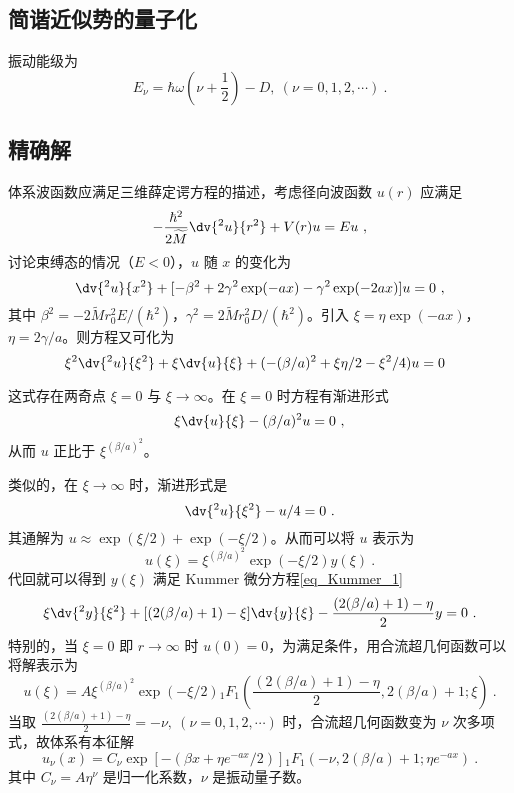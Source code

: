 \subsection{简谐近似势的量子化}
振动能级为
$$E_\nu = \hbar \omega (\nu + \frac12) - D , \ (\nu = 0, 1, 2, \cdots) ~.$$

\subsection{精确解}
体系波函数应满足三维薛定谔方程的描述，考虑径向波函数 $u(r)$ 应满足
\begin{equation}
-\frac{\hbar^2}{2 \widetilde M} \dv{^2 u}{r^2} + V(r) u = Eu ~,
\end{equation}
讨论束缚态的情况（$E<0$），$u$ 随 $x$ 的变化为
\begin{equation}
\dv{^2 u}{x^2} + [-\beta^2 + 2 \gamma^2 \exp(-ax) - \gamma^2 \exp(-2ax)]u = 0 ~,
\end{equation}
其中 $\beta^2 = -2\widetilde M r_0^2 E/(\hbar^2)$，$\gamma^2 = 2\widetilde M r_0^2 D/(\hbar^2)$。引入 $\xi = \eta \exp(-ax)$，$\eta = 2 \gamma/a$。则方程又可化为
\begin{equation}
\xi^2 \dv{^2 u}{\xi^2} + \xi \dv{u}{\xi} + (-(\beta/a)^2 + \xi\eta/2 - \xi^2/4)u = 0 ~~
\end{equation}

这式存在两奇点 $\xi = 0$ 与 $\xi \rightarrow \infty$。在 $\xi = 0$ 时方程有渐进形式
\begin{equation}
\xi \dv{u}{\xi} - (\beta/a)^2 u = 0 ~,
\end{equation}
从而 $u$ 正比于 $\xi^{(\beta/a)^2}$。

类似的，在 $\xi \rightarrow \infty$ 时，渐进形式是
\begin{equation}
\dv{^2 u}{\xi^2} - u/4 = 0 ~.
\end{equation}
其通解为 $u \approx \exp(\xi/2) + \exp(-\xi/2)$。从而可以将 $u$ 表示为
\begin{equation}
u(\xi) = \xi^{(\beta/a)^2} \exp(-\xi/2) y(\xi) ~.
\end{equation}
代回就可以得到 $y(\xi)$ 满足 Kummer 微分方程\autoref{eq_Kummer_1}~
\begin{equation}
\xi \dv{^2 y}{\xi^2} + [(2(\beta/a) + 1) - \xi] \dv{y}{\xi} - \frac{(2(\beta/a) + 1)-\eta}{2}y=0 ~.
\end{equation}
特别的，当 $\xi = 0$ 即 $r \rightarrow \infty$ 时 $u(0) = 0$，为满足条件，用合流超几何函数可以将解表示为
\begin{equation}
u(\xi) = A \xi^{(\beta/a)^2} \exp(-\xi/2) {}_1F_1\left(\frac{(2 (\beta/a) + 1) - \eta}{2}, 2(\beta/a)+1;\xi\right)~.
\end{equation}
当取 $\frac{(2 (\beta/a) + 1) - \eta}{2} = -\nu, \ (\nu = 0, 1, 2, \cdots)$ 时，合流超几何函数变为 $\nu$ 次多项式，故体系有本征解
\begin{equation}
u_\nu(x) = C_\nu \exp\left[- (\beta x + \eta e^{-ax}/2)\right] {}_1F_1 \left(-\nu, 2(\beta/a)+1; \eta e^{-ax}\right)~.
\end{equation}
其中 $C_\nu = A \eta^\nu$ 是归一化系数，$\nu$ 是振动量子数。
